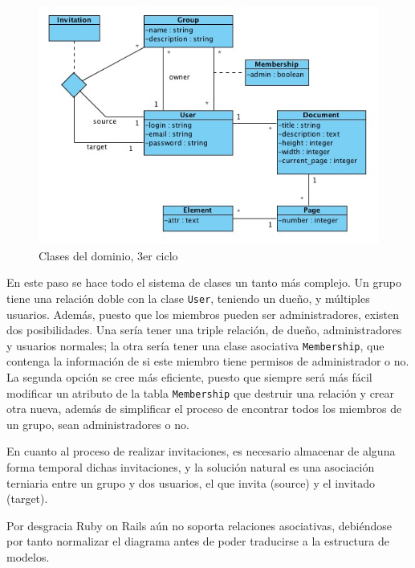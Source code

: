 \begin{figure}[h!]
\centering
\includegraphics[width=14cm]{uml3.png}
\caption{Clases del dominio, 3er ciclo}\label{fig:uml3}
\end{figure}

En este paso se hace todo el sistema de clases un tanto más complejo. Un grupo tiene una relación doble con la clase \texttt{User}, teniendo un dueño, y múltiples usuarios. Además, puesto que los miembros pueden ser administradores, existen dos posibilidades. Una sería tener una triple relación, de dueño, administradores y usuarios normales; la otra sería tener una clase asociativa \texttt{Membership}, que contenga la información de si este miembro tiene permisos de administrador o no. La segunda opción se cree más eficiente, puesto que siempre será más fácil modificar un atributo de la tabla \texttt{Membership} que destruir una relación y crear otra nueva, además de simplificar el proceso de encontrar todos los miembros de un grupo, sean administradores o no.

En cuanto al proceso de realizar invitaciones, es necesario almacenar de alguna forma temporal dichas invitaciones, y la solución natural es una asociación terniaria entre un grupo y dos usuarios, el que invita (source) y el invitado (target).

Por desgracia Ruby on Rails aún no soporta relaciones asociativas, debiéndose por tanto normalizar el diagrama antes de poder traducirse a la estructura de modelos.

